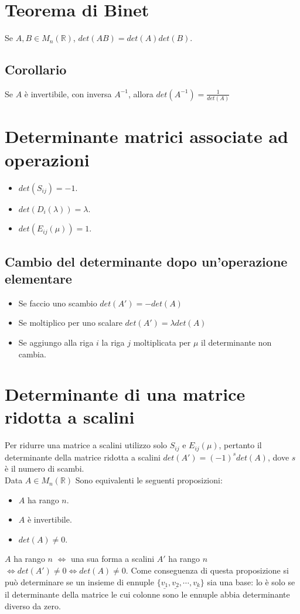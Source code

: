 \section{Teorema di Binet}
Se $A,B\in M_n(\mathbb{R})$, $det(AB)=det(A)det(B)$.
\subsection{Corollario}
Se $A$ \`e invertibile, con inversa $A^{-1}$, allora $det(A^{-1})=\frac{1}{det(A)}$
\section{Determinante matrici associate ad operazioni}
\begin{itemize}
\item $det(S_{ij})=-1$.
\item $det(D_i(\lambda))=\lambda$.
\item $det(E_{ij}(\mu))=1$.
\end{itemize}
\subsection{Cambio del determinante dopo un'operazione elementare}
\begin{itemize}
\item Se faccio uno scambio $det(A')=-det(A)$
\item Se moltiplico per uno scalare $det(A')=\lambda det(A)$
\item Se aggiungo alla riga $i$ la riga $j$ moltiplicata per $\mu$ il determinante non cambia. 
\end{itemize}
\section{Determinante di una matrice ridotta a scalini}
Per ridurre una matrice a scalini utilizzo solo $S_{ij}$ e $E_{ij}(\mu)$, pertanto il determinante della matrice ridotta a scalini $det(A')=(-1)^s det(A)$, dove $s$ \`e il 
numero di scambi.\\
Data $A\in M_n(\mathbb{R})$ Sono equivalenti le seguenti proposizioni:
\begin{itemize}
\item $A$ ha rango $n$.
\item $A$ \`e invertibile.
\item $det(A)\neq 0$.
\end{itemize}
$A$ ha rango $n$ $\Leftrightarrow$ una sua forma a scalini $A'$ ha rango $n$ $\Leftrightarrow det(A')\neq 0\Leftrightarrow det(A)\neq 0$. Come conseguenza di questa proposizione
si pu\`o determinare se un insieme di ennuple $\{\underline{v_1}, \underline{v_2}, \cdots, \underline{v_k}\}$ sia una base: lo \`e solo se il determinante della matrice le cui 
colonne sono le ennuple abbia determinante diverso da zero.
